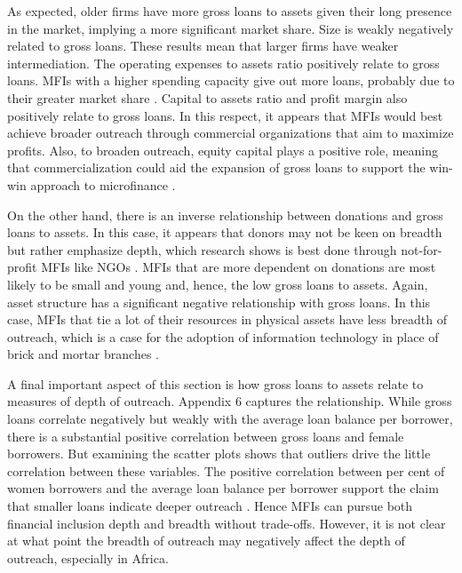 \documentclass[a4paper,nobind]{templates/ociamthesis}
\begin{document}
As expected, older firms have more gross loans to assets given their long presence in the market, implying a more significant market share. Size is weakly negatively related to gross loans. These results mean that larger firms have weaker intermediation. The operating expenses to assets ratio positively relate to gross loans. MFIs with a higher spending capacity give out more loans, probably due to their greater market share \autocite{gutierrez2007microfinance}. Capital to assets ratio and profit margin also positively relate to gross loans. In this respect, it appears that MFIs would best achieve broader outreach through commercial organizations that aim to maximize profits. Also, to broaden outreach, equity capital plays a positive role, meaning that commercialization could aid the expansion of gross loans to support the win-win approach to microfinance \autocite{kodongo2013individual}.

On the other hand, there is an inverse relationship between donations and gross loans to assets. In this case, it appears that donors may not be keen on breadth but rather emphasize depth, which research shows is best done through not-for-profit MFIs like NGOs \autocite{d2017ngos,bos2015practice}. MFIs that are more dependent on donations are most likely to be small and young and, hence, the low gross loans to assets. Again, asset structure has a significant negative relationship with gross loans. In this case, MFIs that tie a lot of their resources in physical assets have less breadth of outreach, which is a case for the adoption of information technology in place of brick and mortar branches \autocite{d2017aid}.

A final important aspect of this section is how gross loans to assets relate to measures of depth of outreach. Appendix 6 captures the relationship. While gross loans correlate negatively but weakly with the average loan balance per borrower, there is a substantial positive correlation between gross loans and female borrowers. But examining the scatter plots shows that outliers drive the little correlation between these variables. The positive correlation between per cent of women borrowers and the average loan balance per borrower support the claim that smaller loans indicate deeper outreach \autocite{ayyagari2013financing}. Hence MFIs can pursue both financial inclusion depth and breadth without trade-offs. However, it is not clear at what point the breadth of outreach may negatively affect the depth of outreach, especially in Africa.
\end{document}
